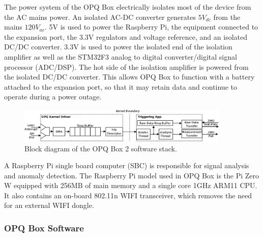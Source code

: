 The power system of the OPQ Box electrically isolates most of the device from the AC mains power.
An isolated AC-DC converter generates $5V_{dc}$ from the mains $120V_{ac}$.
5V is used to power the Raspberry Pi, the equipment connected to the expansion port, the 3.3V regulators and voltage reference, and an isolated DC/DC converter.
3.3V is used to power the isolated end of the isolation amplifier as well as the STM32F3 analog to digital converter/digital signal processor (ADC/DSP).
The hot side of the isolation amplifier is powered from the isolated DC/DC converter.
This allows OPQ Box to function with a battery attached to the expansion port, so that it may retain data and continue to operate during a power outage.

\begin{figure}[ht]
  \begin{center}
  \includegraphics[width=0.9\textwidth]{images/opq-box/opqbox_software.png}
  \end{center}
  \caption{Block diagram of the OPQ Box 2 software stack.}
  \label{fig:opq:3}
\end{figure}

A Raspberry Pi single board computer (SBC) is responsible for signal analysis and anomaly detection.
The Raspberry Pi model used in OPQ Box is the Pi Zero W equipped with 256MB of main memory and a single core 1GHz ARM11 CPU. It also contains an on-board 802.11n WIFI transceiver, which removes the need for an external WIFI dongle.

\subsubsection{OPQ Box Software}\label{subsec:software}

